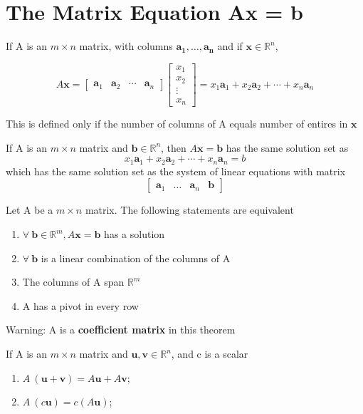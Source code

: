 \documentclass{report}
\begin{document}
\section{The Matrix Equation Ax = b}
\begin{definition}
\end{definition}
If A is an $m \times n$ matrix, with columns $\mathbf{a_1}, \ldots, \mathbf{a_n}$ and if $\mathbf{x} \in \mathbb{R}^n$,

\[
A \mathbf{x} = 
\begin{bmatrix}
\mathbf{a}_1 & \mathbf{a}_2 & \cdots & \mathbf{a}_n
\end{bmatrix}
\begin{bmatrix}
x_1 \\ x_2 \\ \vdots \\ x_n
\end{bmatrix}
= x_1 \mathbf{a}_1 + x_2 \mathbf{a}_2 + \cdots + x_n \mathbf{a}_n
\]

This is defined only if the number of columns of A equals number of entires in $\mathbf{x}$

\begin{theorem}
\end{theorem}
If A is an $m \times n$ matrix and $\mathbf{b} \in \mathbb{R}^n$, then $A \mathbf{x} = \mathbf{b}$ has the same solution set as 
\[
x_1 \mathbf{a}_1 + x_2 \mathbf{a}_2 + \cdots + x_n \mathbf{a}_n = b
\]
which has the same solution set as the system of linear equations with matrix
\[
\begin{bmatrix}
    \mathbf{a}_1 & \ldots & \mathbf{a}_n & \mathbf{b}
\end{bmatrix}
\]

\begin{theorem}
\end{theorem}
Let A be a $m \times n$ matrix. The following statements are equivalent
\begin{enumerate}[label=\alph*.]
    \item $\forall\ \mathbf{b} \in \mathbb{R}^m, A \mathbf{x} = \mathbf{b}$ has a solution
    \item $\forall\ \mathbf{b}$ is a linear combination of the columns of A
    \item The columns of A span $\mathbb{R}^m$
    \item A has a pivot in every row
\end{enumerate}
Warning: A is a \textbf{coefficient matrix} in this theorem

\begin{theorem}
\end{theorem}
If A is an $m \times n$ matrix and $\mathbf{u},\mathbf{v} \in \mathbb{R}^n$, and c is a scalar
\begin{enumerate}[label=\alph*.]
    \item $A\ (\mathbf{u} + \mathbf{v}) = A \mathbf{u} + A \mathbf{v}$;
    \item $A\ (c \mathbf{u}) = c (A \mathbf{u})$;
\end{enumerate}
\end{document}
